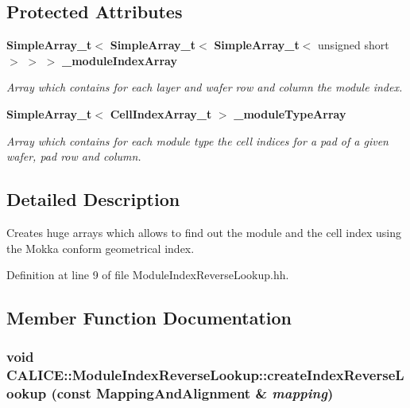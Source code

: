 \subsection*{Protected Attributes}
\begin{DoxyCompactItemize}
\item 
{\bf SimpleArray\_\-t}$<$ {\bf SimpleArray\_\-t}$<$ {\bf SimpleArray\_\-t}$<$ unsigned short $>$ $>$ $>$ {\bf \_\-moduleIndexArray}
\begin{DoxyCompactList}\small\item\em Array which contains for each layer and wafer row and column the module index. \item\end{DoxyCompactList}\item 
{\bf SimpleArray\_\-t}$<$ {\bf CellIndexArray\_\-t} $>$ {\bf \_\-moduleTypeArray}
\begin{DoxyCompactList}\small\item\em Array which contains for each module type the cell indices for a pad of a given wafer, pad row and column. \item\end{DoxyCompactList}\end{DoxyCompactItemize}


\subsection{Detailed Description}
Creates huge arrays which allows to find out the module and the cell index using the Mokka conform geometrical index. 

Definition at line 9 of file ModuleIndexReverseLookup.hh.

\subsection{Member Function Documentation}
\subsubsection[{createIndexReverseLookup}]{\setlength{\rightskip}{0pt plus 5cm}void CALICE::ModuleIndexReverseLookup::createIndexReverseLookup (const MappingAndAlignment \& {\em mapping})}\label{classCALICE_1_1ModuleIndexReverseLookup_a2bd62812d099ee99ec7cd26c8e25b39c}


